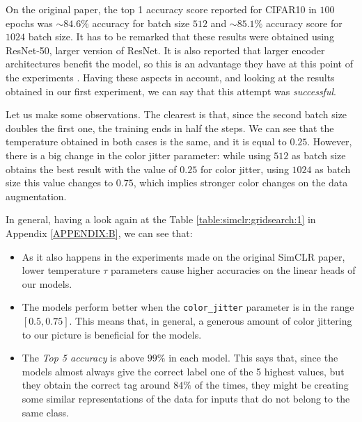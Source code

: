 \begin{table}[H]
    \label{table:best:first:simclr}
\centering
{}
\caption{Best results for the grid search experiment with SimCLR.}
\end{table}

\begin{remark}
On the original paper, the top 1 accuracy score reported for CIFAR10 in $100$ epochs was $\sim 84.6\%$ accuracy for batch size $512$ and $\sim 85.1 \%$ accuracy score for $1024$ batch size. It has to be remarked that these results were obtained using ResNet-50,  larger version of ResNet. It is also reported that larger encoder architectures benefit the model, so this is an advantage they have at this point of the experiments . Having these aspects in account, and looking at the results obtained in our first experiment, we can say that this attempt was \emph{successful}.
\end{remark}

Let us make some observations. The clearest is that, since the second batch size doubles the first one, the training ends in half the steps. We can see that the temperature obtained in both cases is the same, and it is equal to $0.25$. However, there is a big change in the color jitter parameter: while using $512$ as batch size obtains the best result with the value of $0.25$ for color jitter, using $1024$ as batch size this value changes to $0.75$, which implies stronger color changes on the data augmentation. 

In general, having a look again at the Table \ref{table:simclr:gridsearch:1} in Appendix \ref{APPENDIX:B},  we can see that:

\begin{itemize}
    \item As it also happens in the experiments made on the original SimCLR paper, lower temperature $\tau$ parameters cause higher accuracies on the linear heads of our models.
    
    \item The models perform better when the \lstinline{color_jitter} parameter is in the range $[0.5,0.75]$. This means that, in general, a generous amount of color jittering to our picture is beneficial for the models.

    \item The \emph{Top 5 accuracy} is above $99\%$ in each model. This says that, since the models almost always give the correct label one of the 5 highest values, but they obtain the correct tag around $84\%$ of the times, they might be creating some similar representations of the data for inputs that do not belong to the same class. 
\end{itemize}

